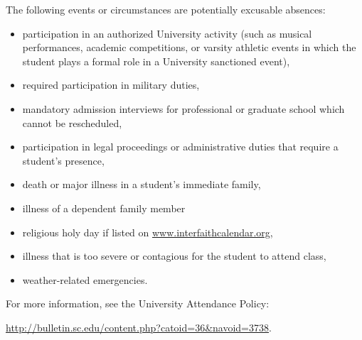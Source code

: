 \documentclass[10pt]{amsart}
\begin{document}
\noindent
The following events or circumstances are potentially excusable absences:
\begin{itemize}
\item
  participation in an authorized University activity (such as musical performances, academic competitions, or varsity athletic events in which the student plays a formal role in a University sanctioned event),
\item
  required participation in military duties,
\item
  mandatory admission interviews for professional or graduate school which cannot be rescheduled,
\item
  participation in legal proceedings or administrative duties that require a student's presence,
\item
  death or major illness in a student’s immediate family,
\item
  illness of a dependent family member
\item
  religious holy day if listed on \url{www.interfaithcalendar.org},
\item
  illness that is too severe or contagious for the student to attend class,
\item
  weather-related emergencies.
\end{itemize}
For more information, see the University Attendance Policy:
\begin{center}
  \url{http://bulletin.sc.edu/content.php?catoid=36\&navoid=3738}.
\end{center}
\end{document}
